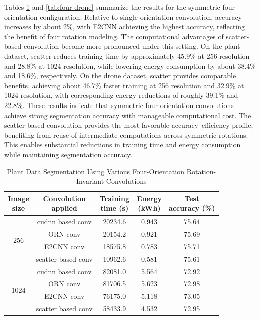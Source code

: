 Tables \ref{tab:four-plant} and \ref{tab:four-drone} summarize the results for the symmetric four-orientation configuration. Relative to single-orientation convolution, accuracy increases by about 2\%, with E2CNN achieving the highest accuracy, reflecting the benefit of four rotation modeling. The computational advantages of scatter-based convolution become more pronounced under this setting. On the plant dataset, scatter reduces training time by approximately 45.9\% at 256 resolution and 28.8\% at 1024 resolution, while lowering energy consumption by about 38.4\% and 18.6\%, respectively. On the drone dataset, scatter provides comparable benefits, achieving about 46.7\% faster training at 256 resolution and 32.9\% at 1024 resolution, with corresponding energy reductions of roughly 39.1\% and 22.8\%. These results indicate that symmetric four-orientation convolutions achieve strong segmentation accuracy with manageable computational cost. The scatter based convolution provides the most favorable accuracy–efficiency profile, benefiting from reuse of intermediate computations across symmetric rotations. This enables substantial reductions in training time and energy consumption while maintaining segmentation accuracy.

\begin{table}[ht]
\centering
\caption{Plant Data Segmentation Using Various Four-Orientation Rotation-Invariant Convolutions}
\renewcommand{\arraystretch}{1.2}
\begin{tabular}{c|c|c|c|c} 
\hline\hline
\shortstack{Image\\size} & 
\shortstack{Convolution\\applied} & 
\shortstack{Training\\time (s)} &  
\shortstack{Energy\\(kWh)} &  
\shortstack{Test\\accuracy (\%)} \\ 
\hline\hline
\multirow{4}{*}{256} 
 & cudnn based conv    & 20234.6  & 0.943  &75.64  \\ \cline{2-5}
 & ORN conv            & 20154.2  & 0.921  &  75.69\\ \cline{2-5}
 & E2CNN conv          & 18575.8  & 0.783  & 75.71 \\ \cline{2-5}
 & scatter based conv  & 10962.6  & 0.581  & 75.61 \\
\hline
\multirow{4}{*}{1024} 
 & cudnn based conv    & 82081.0  & 5.564   &72.92  \\ \cline{2-5}
 & ORN conv            & 81706.5  & 5.623   &72.98  \\ \cline{2-5}
 & E2CNN conv          & 76175.0  & 5.118   &73.05  \\ \cline{2-5}
 & scatter based conv  & 58433.9  & 4.532   &72.95  \\
\hline
\end{tabular}
\label{tab:four-plant}
\end{table}

